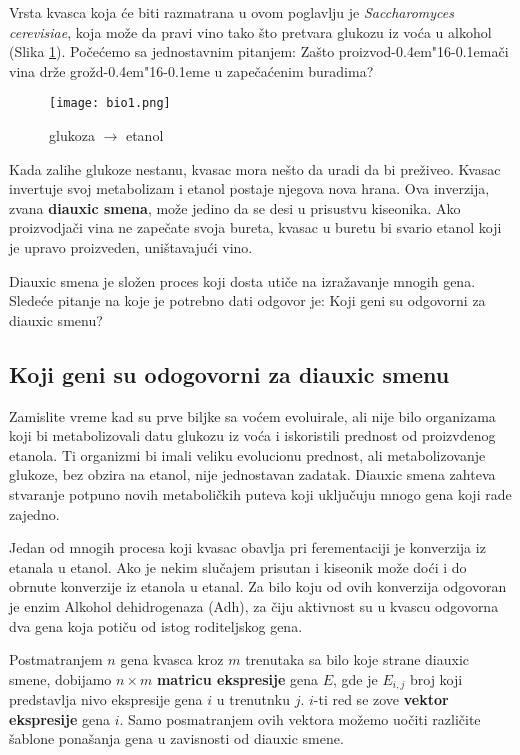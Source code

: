 \documentclass[a4paper]{book}
\def \dj {d\kern-0.4em\char"16\kern-0.1em}
\begin{document}
Vrsta kvasca koja će biti razmatrana u ovom poglavlju je  \emph{Saccharomyces cerevisiae}, koja može da pravi vino tako što pretvara glukozu iz voća u alkohol (Slika \ref{slika 1}). Počećemo sa jednostavnim pitanjem: Zašto proizvo\dj ači vina drže grož\dj e u zapečaćenim buradima?
\begin{figure}[h]
    \centering
    \texttt{[image: bio1.png]}
    \caption{glukoza $\rightarrow$ etanol}
    \label{slika 1}
\end{figure}

Kada zalihe glukoze nestanu, kvasac mora nešto da uradi da bi preživeo. Kvasac invertuje svoj metabolizam i  etanol postaje njegova nova hrana. Ova inverzija, zvana \textbf{diauxic smena}, može jedino da se desi u prisustvu kiseonika. Ako proizvodjači vina ne zapečate svoja bureta, kvasac u buretu bi svario etanol koji je upravo proizveden, uništavajući vino.

Diauxic smena je složen proces koji dosta utiče na izražavanje mnogih gena. Sledeće pitanje na koje je potrebno dati odgovor je: Koji geni su odgovorni za diauxic smenu?

\subsection{Koji geni su odogovorni za diauxic smenu}
Zamislite vreme kad su prve biljke sa voćem evoluirale, ali nije bilo organizama koji bi metabolizovali datu glukozu iz voća i iskoristili prednost od proizvdenog etanola. Ti organizmi bi imali veliku evolucionu prednost, ali metabolizovanje glukoze, bez obzira na etanol, nije jednostavan zadatak. Diauxic smena zahteva stvaranje potpuno novih metaboličkih puteva koji uključuju mnogo gena koji rade zajedno.

Jedan od mnogih procesa koji kvasac obavlja pri ferementaciji je konverzija iz etanala u etanol. Ako je nekim slučajem prisutan i kiseonik može doći i do obrnute konverzije iz etanola u etanal. Za bilo koju od ovih konverzija odgovoran je enzim Alkohol dehidrogenaza (Adh), za čiju aktivnost su u kvascu odgovorna dva gena koja potiču od istog roditeljskog gena. 

Postmatranjem $n$ gena kvasca kroz $m$ trenutaka sa bilo koje strane diauxic smene, dobijamo $n \times m$ \textbf{matricu ekspresije} gena $E$, gde je $E_{i,j}$ broj koji predstavlja nivo ekspresije gena $i$ u trenutnku $j$. $i$-ti red se zove \textbf{vektor ekspresije} gena $i$. Samo posmatranjem ovih vektora možemo uočiti različite šablone ponašanja gena u zavisnosti od diauxic smene.
\end{document}
